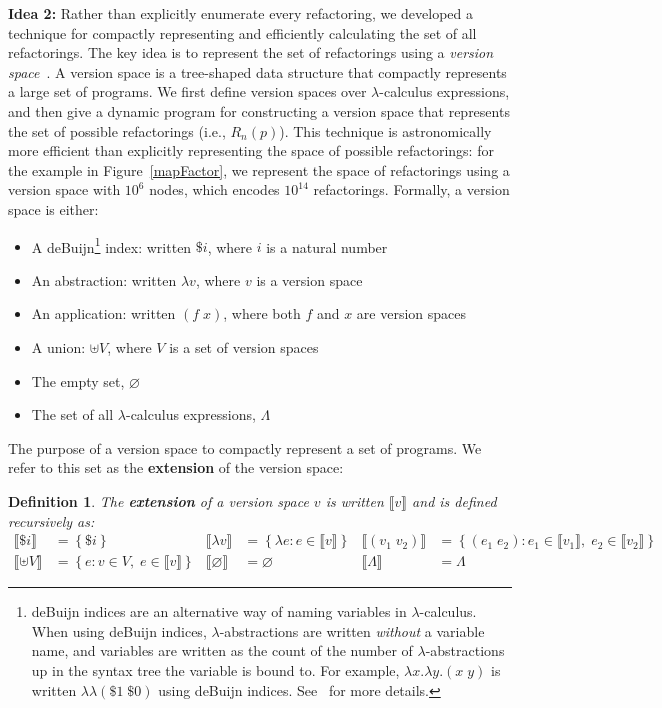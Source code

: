 \documentclass{article}
\newcommand{\denotation}[1]{{\llbracket #1 \rrbracket}}
\newtheorem{definition}{Definition}
\begin{document}
\textbf{Idea 2:} Rather than explicitly enumerate every refactoring,
we developed a technique for compactly representing and efficiently
calculating the set of all refactorings.  The key idea is to represent
the set of refactorings using a \emph{version
  space}~\cite{lau2001programming,mitchell1977version,polozov2015flashmeta}.
A version space is a tree-shaped data structure
that compactly represents a large set of programs.
We first define version spaces over $\lambda$-calculus expressions,
and then give a dynamic program for constructing a version space
that represents the set of possible refactorings (i.e., $R_n(p)$).
This technique is astronomically more efficient than
explicitly representing
the space of possible refactorings:
for the example in Figure~\ref{mapFactor},
we represent
the space of refactorings using a version space with
$10^6$ nodes,
which encodes $10^{14}$ refactorings.
Formally, a version space is either:
\begin{itemize}
\item A deBuijn\footnote{deBuijn indices are an alternative way of naming variables in $\lambda$-calculus. When using deBuijn indices, $\lambda$-abstractions are written \emph{without} a variable name, and variables are written as the count of the number of $\lambda$-abstractions up in the syntax tree the variable is bound to. For example, $\lambda x.\lambda y. (x\;y)$ is written $\lambda\lambda (\$1\;\$0)$ using deBuijn indices. See~\cite{pierce} for more details.} index: written $\$i$, where $i$ is a natural number
\item An abstraction: written $\lambda v$, where $v$ is a version space
\item An  application: written $(f \;x)$, where both  $f$ and $x$ are version spaces
\item A  union: $\uplus V$, where $V$ is a set of version spaces
\item The empty set, $\varnothing$
\item The set of all $\lambda$-calculus expressions, $\Lambda$
\end{itemize}
The purpose of a version space to compactly represent a set of programs.
We refer to this set as the \textbf{extension} of the version space:
\begin{definition}
  The \textbf{extension} of a version space $v$ is written $\denotation{v}$
  and is defined recursively as:
  \begin{align*}
    \denotation{\$i}& = \left\{\$i \right\}&
    \denotation{\lambda v}& = \left\{\lambda e : e\in \denotation{v} \right\}&
    \denotation{(v_1\; v_2)}& = \left\{(e_1\;e_2) : e_1\in \denotation{v_1},\;e_2\in \denotation{v_2} \right\}\\
    \denotation{\uplus V}& = \left\{e : v\in V,\;e\in \denotation{v} \right\}&
    \denotation{\varnothing}& = \varnothing&
    \denotation{\Lambda}& = \Lambda
    \end{align*}
\end{definition}
\end{document}
